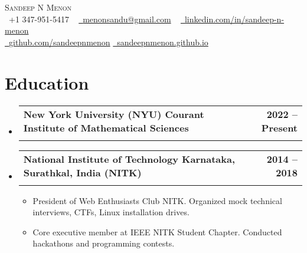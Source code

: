 \documentclass[12pt]{article}
\makeatletter
\newcommand{\resumeItem}[1]{
  \item\small{
    {#1 \vspace{-2pt}}
  }
}
\newcommand{\resumeEducation}[4]{
  \vspace{-2pt}\item
    \begin{tabular*}{1.0\textwidth}[t]{l@{\extracolsep{\fill}}r}
      \textbf{#1} & \textbf{\small #2} \\
      \text{\small#3} & \text{\color{italic-color}\small #4} \\
    \end{tabular*}\vspace{-7pt}
}
\newcommand{\resumeSubHeadingListStart}{\begin{itemize}[leftmargin=0.0in, label={}]\itemsep1pt}
\newcommand{\resumeSubHeadingListEnd}{\end{itemize}}
\newcommand{\resumeItemListStart}{\begin{itemize}\itemsep1pt}
\newcommand{\resumeItemListEnd}{\end{itemize}}
\makeatother
\begin{document}


\begin{center}
    {\Huge \scshape Sandeep N Menon} \\ \vspace{1pt}
    \small \raisebox{-0.1\height}\faPhone\ +1 347-951-5417 ~ \href{mailto:menonsandu@gmail.com}{\raisebox{-0.2\height}\faEnvelope\  {menonsandu@gmail.com}} ~ 
    \href{https://linkedin.com/in/sandeep-n-menon}{\raisebox{-0.2\height}\faLinkedin\ {linkedin.com/in/sandeep-n-menon}}  \\
    \href{https://github.com/sandeepnmenon}{\raisebox{-0.2\height}\faGithub\ {github.com/sandeepnmenon}} \href{https://sandeepnmenon.github.io/}{\raisebox{-0.2\height}\faHome \ sandeepnmenon.github.io}
    \vspace{-10pt}
\end{center}



\section{Education}
  \resumeSubHeadingListStart
    \resumeEducation{New York University (NYU) Courant Institute of Mathematical Sciences}{2022 -- Present}{Masters in Computer Science}{New York, USA}
    \resumeEducation
      {National Institute of Technology Karnataka, Surathkal, India (NITK)}{2014 -- 2018}
      {Bachelor of Technology in Computer Science - CGPA: 8.83/10}{Karnataka, India}
      \resumeItemListStart
                \resumeItem{President of Web Enthusiasts Club NITK. Organized mock technical interviews, CTFs, Linux installation drives.}
                \vspace{-16pt}
                \resumeItem{Core executive member at IEEE NITK Student Chapter. Conducted hackathons and programming contests.}
        \resumeItemListEnd
    \vspace{-10pt}
  \resumeSubHeadingListEnd
\end{document}

